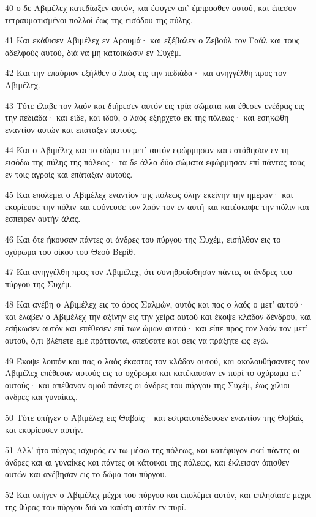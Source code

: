 \par 40 ο δε Αβιμέλεχ κατεδίωξεν αυτόν, και έφυγεν απ' έμπροσθεν αυτού, και έπεσον τετραυματισμένοι πολλοί έως της εισόδου της πύλης.
\par 41 Και εκάθισεν Αβιμέλεχ εν Αρουμά· και εξέβαλεν ο Ζεβούλ τον Γαάλ και τους αδελφούς αυτού, διά να μη κατοικώσιν εν Συχέμ.
\par 42 Και την επαύριον εξήλθεν ο λαός εις την πεδιάδα· και ανηγγέλθη προς τον Αβιμέλεχ.
\par 43 Τότε έλαβε τον λαόν και διήρεσεν αυτόν εις τρία σώματα και έθεσεν ενέδρας εις την πεδιάδα· και είδε, και ιδού, ο λαός εξήρχετο εκ της πόλεως· και εσηκώθη εναντίον αυτών και επάταξεν αυτούς.
\par 44 Και ο Αβιμέλεχ και το σώμα το μετ' αυτόν εφώρμησαν και εστάθησαν εν τη εισόδω της πύλης της πόλεως· τα δε άλλα δύο σώματα εφώρμησαν επί πάντας τους εν τοις αγροίς και επάταξαν αυτούς.
\par 45 Και επολέμει ο Αβιμέλεχ εναντίον της πόλεως όλην εκείνην την ημέραν· και εκυρίευσε την πόλιν και εφόνευσε τον λαόν τον εν αυτή και κατέσκαψε την πόλιν και έσπειρεν αυτήν άλας.
\par 46 Και ότε ήκουσαν πάντες οι άνδρες του πύργου της Συχέμ, εισήλθον εις το οχύρωμα του οίκου του Θεού Βερίθ.
\par 47 Και ανηγγέλθη προς τον Αβιμέλεχ, ότι συνηθροίσθησαν πάντες οι άνδρες του πύργου της Συχέμ.
\par 48 Και ανέβη ο Αβιμέλεχ εις το όρος Σαλμών, αυτός και πας ο λαός ο μετ' αυτού· και έλαβεν ο Αβιμέλεχ την αξίνην εις την χείρα αυτού και έκοψε κλάδον δένδρου, και εσήκωσεν αυτόν και επέθεσεν επί των ώμων αυτού· και είπε προς τον λαόν τον μετ' αυτού, ό,τι βλέπετε εμέ πράττοντα, σπεύσατε και σεις να πράξητε ως εγώ.
\par 49 Έκοψε λοιπόν και πας ο λαός έκαστος τον κλάδον αυτού, και ακολουθήσαντες τον Αβιμέλεχ επέθεσαν αυτούς εις το οχύρωμα και κατέκαυσαν εν πυρί το οχύρωμα επ' αυτούς· και απέθανον ομού πάντες οι άνδρες του πύργου της Συχέμ, έως χίλιοι άνδρες και γυναίκες.
\par 50 Τότε υπήγεν ο Αβιμέλεχ εις Θαβαίς· και εστρατοπέδευσεν εναντίον της Θαβαίς και εκυρίευσεν αυτήν.
\par 51 Αλλ' ήτο πύργος ισχυρός εν τω μέσω της πόλεως, και κατέφυγον εκεί πάντες οι άνδρες και αι γυναίκες και πάντες οι κάτοικοι της πόλεως, και έκλεισαν όπισθεν αυτών και ανέβησαν εις το δώμα του πύργου.
\par 52 Και υπήγεν ο Αβιμέλεχ μέχρι του πύργου και επολέμει αυτόν, και επλησίασε μέχρι της θύρας του πύργου διά να καύση αυτόν εν πυρί.
